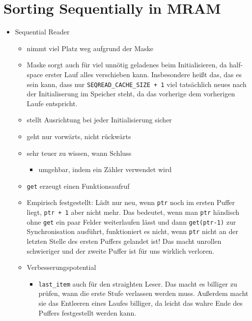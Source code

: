 \chapter{Sorting Sequentially in MRAM}
\label{sec:mram}

\begin{itemize}
	\item
	Sequential Reader
	\begin{itemize}
		\item
		nimmt viel Platz weg aufgrund der Maske

		\item
		Maske sorgt auch für viel unnötig geladenes beim Initialisieren, da half-space \MS{} erster Lauf alles verschieben kann.
		Insbesondere heißt das, das es sein kann, dass nur \lstinline|SEQREAD_CACHE_SIZE + 1| viel tatsächlich neues nach der Initialiserung im Speicher steht, da das vorherige dem vorherigen Laufe entspricht.

		\item
		stellt Ausrichtung bei jeder Initialisierung sicher

		\item
		geht nur vorwärts, nicht rückwärts

		\item
		sehr teuer zu wissen, wann Schluss
		\begin{itemize}
			\item
			umgehbar, indem ein Zähler verwendet wird
		\end{itemize}

		\item
		\lstinline|get| erzeugt einen Funktionsaufruf

		\item
		Empirisch festgestellt:
		Lädt nur neu, wenn \lstinline|ptr| noch im ersten Puffer liegt, \lstinline|ptr + 1| aber nicht mehr.
		Das bedeutet, wenn man \lstinline|ptr| händisch ohne \lstinline|get| ein paar Felder weiterlaufen lässt und dann \lstinline|get(ptr-1)| zur Synchronisation ausführt, funktioniert es nicht, wenn \lstinline|ptr| nicht an der letzten Stelle des ersten Puffers gelandet ist!
		Das macht unrollen schwieriger und der zweite Puffer ist für uns wirklich verloren.

		\item
		Verbesserungspotential
		\begin{itemize}
			\item
			\lstinline|last_item| auch für den straighten Leser.
			Das macht es billiger zu prüfen, wann die erste Stufe verlassen werden muss.
			Außerdem macht sie das Entleeren eines Laufes billiger, da leicht das wahre Ende des Puffers festgestellt werden kann.
		\end{itemize}


\end{itemize}
\end{itemize}
